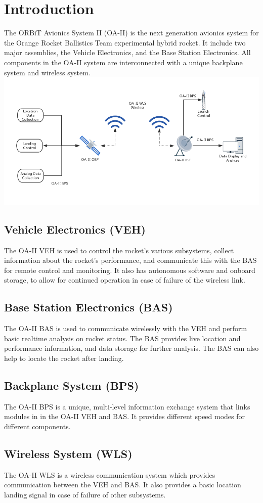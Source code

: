 \documentclass[12pt,article]{memoir}
\begin{document}
\section{Introduction}
The ORBiT Avionics System II (OA-II) is the next generation avionics system for the Orange Rocket Ballistics Team experimental hybrid rocket. It include two major assemblies, the Vehicle Electronics, and the Base Station Electronics. All components in the OA-II system are interconnected with a unique backplane system and wireless system.
\includegraphics[width=\textwidth]{sys_diag.png}
\subsection{Vehicle Electronics (VEH)}
The OA-II VEH is used to control the rocket's various subsystems, collect information about the rocket's performance, and communicate this with the BAS for remote control and monitoring. It also has autonomous software and onboard storage, to allow for continued operation in case of failure of the wireless link.
\subsection{Base Station Electronics (BAS)}
The OA-II BAS is used to communicate wirelessly with the VEH and perform basic realtime analysis on rocket status. The BAS provides live location and performance information, and data storage for further analysis. The BAS can also help to locate the rocket after landing.
\subsection{Backplane System (BPS)}
The OA-II BPS is a unique, multi-level information exchange system that links modules in in the OA-II VEH and BAS. It provides different speed modes for different components.
\subsection{Wireless System (WLS)}
The OA-II WLS is a wireless communication system which provides communication between the VEH and BAS. It also provides a basic location landing signal in case of failure of other subsystems.
\end{document}
